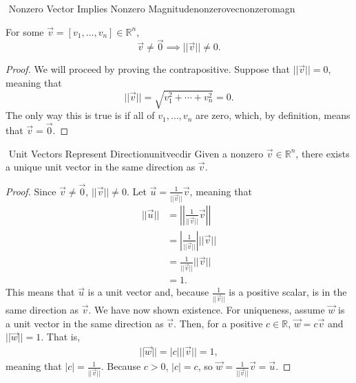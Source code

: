     \begin{theorem}{\Stop\,\,Nonzero Vector Implies Nonzero Magnitude}{nonzerovecnonzeromagn}

        For some \(\vec{v}=[v_1,\ldots,v_n]\in\mathbb{R}^n\), 
        \begin{equation*}
            \vec{v}\neq\vec{0}\implies||\vec{v}||\neq0.
        \end{equation*}
        \begin{proof}
            We will proceed by proving the contrapositive. Suppose that \(||\vec{v}||=0\), meaning that
            \begin{equation*}
                ||\vec{v}||=\sqrt{v_1^2+\cdots+v_n^2}=0.
            \end{equation*}
            The only way this is true is if all of \(v_1,\ldots,v_n\) are zero, which, by definition, means that \(\vec{v}=\vec{0}\).
        \end{proof}
        
    \end{theorem}
    \pagebreak
    \begin{theorem}{\Stop\,\,Unit Vectors Represent Direction}{unitvecdir}
        Given a nonzero \(\vec{v}\in\mathbb{R}^n\), there exists a unique unit vector in the same direction as \(\vec{v}\).
        \begin{proof}
            Since \(\vec{v}\neq\vec{0}\), \(||\vec{v}||\neq0\). Let \(\vec{u}=\frac{1}{||\vec{v}||}\vec{v}\), meaning that
            \begin{align*}
                ||\vec{u}||&=\left|\left|\frac{1}{||\vec{v}||}\vec{v}\right|\right| \\
                &=\left|\frac{1}{||\vec{v}||}\right|||\vec{v}|| \\
                &=\frac{1}{||\vec{v}||}||\vec{v}|| \\
                &=1.
            \end{align*}
            This means that \(\vec{u}\) is a unit vector and, because \(\frac{1}{||\vec{v}||}\) is a positive scalar, is in the same direction as \(\vec{v}\). We have now shown existence. For uniqueness, assume \(\vec{w}\) is a unit vector in the same direction as \(\vec{v}\). Then, for a positive \(c\in\mathbb{R}\), \(\vec{w}=c\vec{v}\) and \(||\vec{w}||=1\). That is,
            \begin{align*}
                ||\vec{w}||=|c|||\vec{v}||=1,
            \end{align*}
            meaning that \(|c|=\frac{1}{||\vec{v}||}\). Because \(c>0\), \(|c|=c\), so \(\vec{w}=\frac{1}{||\vec{v}||}\vec{v}=\vec{u}\).
        \end{proof}
    \end{theorem}

